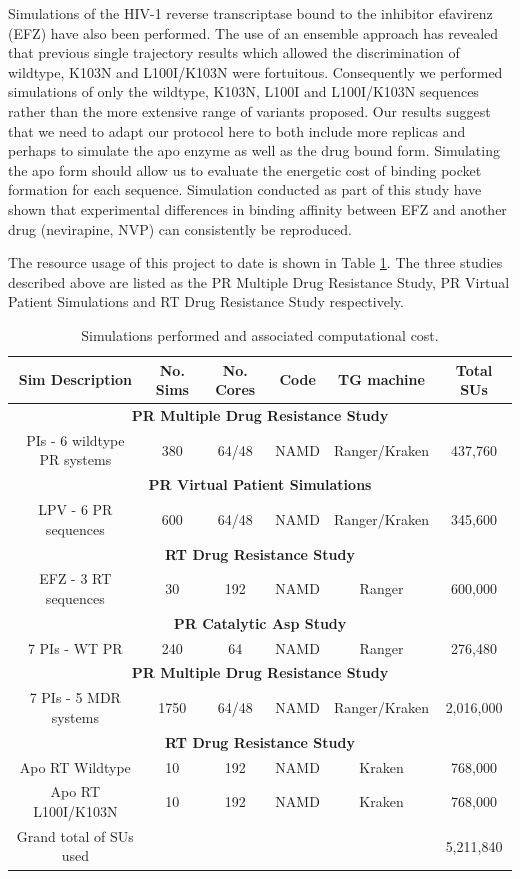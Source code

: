 \documentclass[a4paper,11pt]{article}
\begin{document}
Simulations of the HIV-1 reverse transcriptase bound to the inhibitor efavirenz (EFZ) have also 
been performed. The use of an ensemble approach has revealed that previous single trajectory results 
which allowed the discrimination of wildtype, K103N and L100I/K103N were fortuitous. Consequently we 
performed simulations of only the wildtype, K103N, L100I and L100I/K103N sequences rather than the 
more extensive range of variants proposed. Our results suggest that we need to adapt our protocol here 
to both include more replicas and perhaps to simulate the apo enzyme as well as the drug bound form. 
Simulating the apo form should allow us to evaluate the energetic cost of binding pocket formation 
for each sequence. Simulation conducted as part of this study have shown that experimental differences 
in binding affinity between EFZ and another drug (nevirapine, NVP) can consistently be reproduced.

The resource usage of this project to date is shown in Table \ref{t:hiv_used}. The three studies 
described above are listed as the PR Multiple Drug Resistance Study, PR Virtual Patient Simulations 
and RT Drug Resistance Study respectively.

\begin{table}[h]

\centering
\begin{tabular}[b]
{|c|c|c|c|c|c|}
\hline
\textbf{Sim Description} & \textbf{No. Sims} & \textbf{No. Cores} & \textbf{Code} & \textbf{TG machine} & \textbf{Total SUs}\\
\hline
\multicolumn{6}{|c|}{\textbf{PR Multiple Drug Resistance Study}}\\
\hline
PIs - 6 wildtype PR systems & 380 & 64/48 & NAMD & Ranger/Kraken & 437,760 \\
\hline
\multicolumn{6}{|c|}{\textbf{PR Virtual Patient Simulations}}\\
\hline
LPV - 6 PR sequences & 600 & 64/48 & NAMD & Ranger/Kraken & 345,600 \\
\hline
\multicolumn{6}{|c|}{\textbf{RT Drug Resistance Study}}\\
\hline
EFZ - 3 RT sequences & 30 & 192 & NAMD & Ranger & 600,000\\
\hline
\multicolumn{6}{|c|}{\textbf{PR Catalytic Asp Study}}\\
\hline
7 PIs - WT PR & 240 & 64 & NAMD & Ranger & 276,480 \\
\hline
\multicolumn{6}{|c|}{\textbf{PR Multiple Drug Resistance Study}}\\
\hline
7 PIs - 5 MDR systems & 1750 & 64/48 & NAMD & Ranger/Kraken & 2,016,000 \\
\hline
\multicolumn{6}{|c|}{\textbf{RT Drug Resistance Study}}\\
\hline
Apo RT Wildtype & 10 & 192  & NAMD & Kraken & 768,000\\
\hline
Apo RT L100I/K103N & 10 & 192 & NAMD & Kraken & 768,000\\
\hline
Grand total of SUs used & & & & & 5,211,840 \\
\hline
\end{tabular} \caption{Simulations performed and associated computational cost.}
\label{t:hiv_used}
\end{table}
\end{document}
